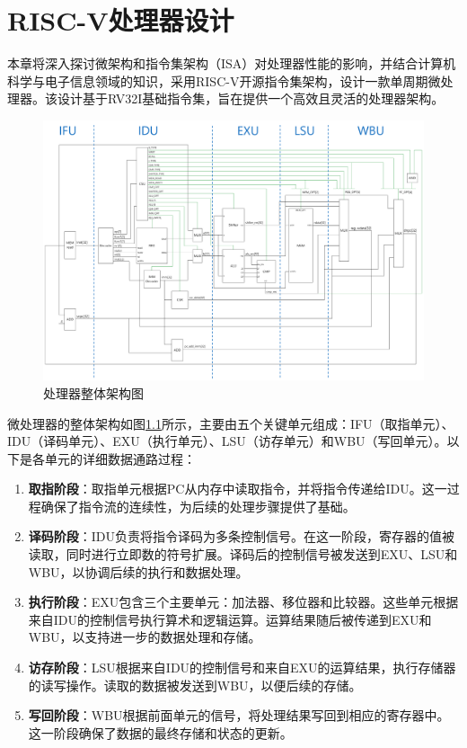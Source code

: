 

\chapter{RISC-V处理器设计}
本章将深入探讨微架构和指令集架构（ISA）对处理器性能的影响，并结合计算机科学与电子信息领域的知识，采用RISC-V开源指令集架构，设计一款单周期微处理器。该设计基于RV32I基础指令集，旨在提供一个高效且灵活的处理器架构。

\begin{figure}[htbp]
	\centering
	\includegraphics[width=1\textwidth]{image/cpu.pdf}
	\caption{处理器整体架构图}
	\label{fig:cpu}
\end{figure}

微处理器的整体架构如图\ref{fig:cpu}所示，主要由五个关键单元组成：IFU（取指单元）、IDU（译码单元）、EXU（执行单元）、LSU（访存单元）和WBU（写回单元）。以下是各单元的详细数据通路过程：

\begin{enumerate}[label={\arabic*)},itemsep=0pt, parsep=0pt]
	\item \textbf{取指阶段}：取指单元根据PC从内存中读取指令，并将指令传递给IDU。这一过程确保了指令流的连续性，为后续的处理步骤提供了基础。
	\item \textbf{译码阶段}：IDU负责将指令译码为多条控制信号。在这一阶段，寄存器的值被读取，同时进行立即数的符号扩展。译码后的控制信号被发送到EXU、LSU和WBU，以协调后续的执行和数据处理。
	\item \textbf{执行阶段}：EXU包含三个主要单元：加法器、移位器和比较器。这些单元根据来自IDU的控制信号执行算术和逻辑运算。运算结果随后被传递到EXU和WBU，以支持进一步的数据处理和存储。
	\item \textbf{访存阶段}：LSU根据来自IDU的控制信号和来自EXU的运算结果，执行存储器的读写操作。读取的数据被发送到WBU，以便后续的存储。
	\item \textbf{写回阶段}：WBU根据前面单元的信号，将处理结果写回到相应的寄存器中。这一阶段确保了数据的最终存储和状态的更新。
\end{enumerate}

